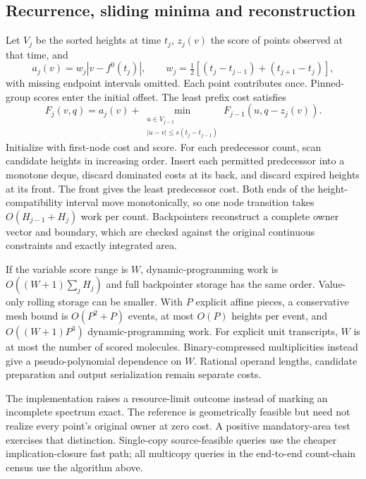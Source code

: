 \documentclass[10pt,letterpaper]{article}
\begin{document}
\subsection{Recurrence, sliding minima and reconstruction}
Let $V_j$ be the sorted heights at time $t_j$, $z_j(v)$ the score of points observed at that time, and
\[
 a_j(v)=w_j|v-f^0(t_j)|,\qquad
 w_j=\tfrac12[(t_j-t_{j-1})+(t_{j+1}-t_j)],
\]
with missing endpoint intervals omitted. Each point contributes once. Pinned-group scores enter the initial offset. The least prefix cost satisfies
\[
 F_j(v,q)=a_j(v)+
 \min_{\substack{u\in V_{j-1}\\|u-v|\le s(t_j-t_{j-1})}}
 F_{j-1}(u,q-z_j(v)).
\]
Initialize with first-node cost and score. For each predecessor count, scan candidate heights in increasing order. Insert each permitted predecessor into a monotone deque, discard dominated costs at its back, and discard expired heights at its front. The front gives the least predecessor cost. Both ends of the height-compatibility interval move monotonically, so one node transition takes $O(H_{j-1}+H_j)$ work per count. Backpointers reconstruct a complete owner vector and boundary, which are checked against the original continuous constraints and exactly integrated area.

If the variable score range is $W$, dynamic-programming work is $O((W+1)\sum_jH_j)$ and full backpointer storage has the same order. Value-only rolling storage can be smaller. With $P$ explicit affine pieces, a conservative mesh bound is $O(P^2+P)$ events, at most $O(P)$ heights per event, and $O((W+1)P^3)$ dynamic-programming work. For explicit unit transcripts, $W$ is at most the number of scored molecules. Binary-compressed multiplicities instead give a pseudo-polynomial dependence on $W$. Rational operand lengths, candidate preparation and output serialization remain separate costs.

The implementation raises a resource-limit outcome instead of marking an incomplete spectrum exact. The reference is geometrically feasible but need not realize every point's original owner at zero cost. A positive mandatory-area test exercises that distinction. Single-copy source-feasible queries use the cheaper implication-closure fast path; all multicopy queries in the end-to-end count-chain census use the algorithm above.
\end{document}
